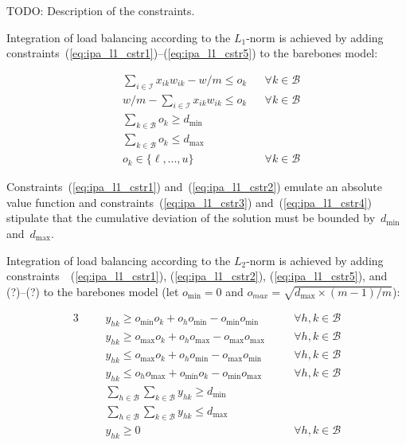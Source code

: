 \documentclass{llncs}
\begin{document}
TODO: Description of the constraints.

Integration of load balancing according to the $L_{1}$-norm is achieved by adding constraints~(\ref{eq:ipa_l1_cstr1})--(\ref{eq:ipa_l1_cstr5}) to the barebones model:

\begin{align}
  & \sum \limits_{i \in \mathcal{I}} x_{ik} w_{ik} - w/m \leq o_{k} && \forall k \in \mathcal{B} \label{eq:ipa_l1_cstr1} \\
  & w/m - \sum \limits_{i \in \mathcal{I}} x_{ik} w_{ik} \leq o_{k} && \forall k \in \mathcal{B} \label{eq:ipa_l1_cstr2} \\
  & \sum \limits_{k \in \mathcal{B}} o_{k} \geq d_{\min}            &&                           \label{eq:ipa_l1_cstr3} \\
  & \sum \limits_{k \in \mathcal{B}} o_{k} \leq d_{\max}            &&                           \label{eq:ipa_l1_cstr4} \\
  & o_{k} \in \{\ell, ..., u\}                                      && \forall k \in \mathcal{B} \label{eq:ipa_l1_cstr5}
\end{align}

Constraints~(\ref{eq:ipa_l1_cstr1}) and~(\ref{eq:ipa_l1_cstr2}) emulate an absolute value function and constraints~(\ref{eq:ipa_l1_cstr3}) and~(\ref{eq:ipa_l1_cstr4}) stipulate that the cumulative deviation of the solution must be bounded by~$d_{\min}$ and~$d_{\max}$.

Integration of load balancing according to the $L_{2}$-norm is achieved by adding constraints~~(\ref{eq:ipa_l1_cstr1}), (\ref{eq:ipa_l1_cstr2}), (\ref{eq:ipa_l1_cstr5}), and (?)--(?) to the barebones model (let $o_{\min} = 0$ and $o_{max} = \sqrt{d_{\max} \times (m-1)/m}$):

\begin{alignat}{3}
  &&& y_{hk} \geq o_{\min}o_{k}+o_{h}o_{\min}-o_{\min}o_{\min} && \quad \forall h,k \in \mathcal{B} \\
  &&& y_{hk} \geq o_{\max}o_{k}+o_{h}o_{\max}-o_{\max}o_{\max} && \quad \forall h,k \in \mathcal{B} \\
  &&& y_{hk} \leq o_{\max}o_{k}+o_{h}o_{\min}-o_{\max}o_{\min} && \quad \forall h,k \in \mathcal{B} \\
  &&& y_{hk} \leq o_{h}o_{\max}+o_{\min}o_{k}-o_{\min}o_{\max} && \quad \forall h,k \in \mathcal{B} \\
  &&& \sum \limits_{h \in \mathcal{B}} \sum \limits_{k \in \mathcal{B}} y_{hk} \geq d_{\min} \\
  &&& \sum \limits_{h \in \mathcal{B}} \sum \limits_{k \in \mathcal{B}} y_{hk} \leq d_{\max} \\  
  &&& y_{hk} \geq 0 && \quad \forall h,k \in \mathcal{B}
\end{alignat}
\end{document}
